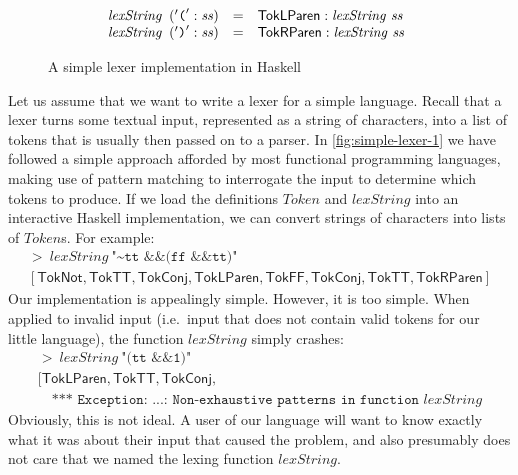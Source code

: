 \begin{figure}[t]
\begin{displaymath}
\begin{array}{l}
\begin{array}{l}
\begin{array}{@{}l@{\hspace{0.5em}}lcl}
          \mathit{lexString}&('\texttt{(}':\mathit{ss})&=&\mathsf{TokLParen} : \mathit{lexString}~\mathit{ss} \\
          \mathit{lexString}&('\texttt{)}':\mathit{ss})&=&\mathsf{TokRParen} : \mathit{lexString}~\mathit{ss} \\
        \end{array}
      \end{array}
    \end{array}
  \end{displaymath}
  \caption{A simple lexer implementation in Haskell}
\label{fig:simple-lexer-1}
\end{figure}

Let us assume that we want to write a lexer for a simple
language. Recall that a lexer turns some textual input, represented as
a string of characters, into a list of tokens that is usually then
passed on to a parser. In \autoref{fig:simple-lexer-1} we have
followed a simple approach afforded by most functional programming
languages, making use of pattern matching to interrogate the input to
determine which tokens to produce. If we load the definitions
$\mathit{Token}$ and $\mathit{lexString}$ into an interactive Haskell
implementation, we can convert strings of characters into lists of
$\mathit{Token}$s. For example:
\begin{displaymath}
  \begin{array}{l}
    >~\mathit{lexString}~\texttt{"\textasciitilde{}tt \&\& (ff \&\& tt)"} \\
    {}[\mathsf{TokNot}, \mathsf{TokTT}, \mathsf{TokConj}, \mathsf{TokLParen}, \mathsf{TokFF}, \mathsf{TokConj}, \mathsf{TokTT}, \mathsf{TokRParen}]
  \end{array}
\end{displaymath}
Our implementation is appealingly simple. However, it is too
simple. When applied to invalid input (i.e.~input that does not
contain valid tokens for our little language), the function
$\mathit{lexString}$ simply crashes:
\begin{displaymath}
  \begin{array}{l}
    >~\mathit{lexString}~\texttt{"(tt \&\& 1)"} \\
    {}[\mathsf{TokLParen}, \mathsf{TokTT}, \mathsf{TokConj}, \\
    \quad\texttt{*** Exception: ...: Non-exhaustive patterns in function }\mathit{lexString}
  \end{array}
\end{displaymath}
Obviously, this is not ideal. A user of our language will want to know
exactly what it was about their input that caused the problem, and
also presumably does not care that we named the lexing function
$\mathit{lexString}$.

